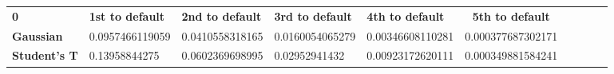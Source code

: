 \begin{center}
 \begin{tabular}{|l|l|l|l|l|c|c|c|c|c|}
\hline
\textbf{0} & \textbf{1st to default} & \textbf{2nd to default} & \textbf{3rd to default} & \textbf{4th to default} & \textbf{5th to default}\\\hhline{|=|=|=|=|=|=|}
\textbf{Gaussian} & 0.0957466119059 & 0.0410558318165 & 0.0160054065279 & 0.00346608110281 & 0.000377687302171\\
\textbf{Student's T} & 0.13958844275 & 0.0602369698995 & 0.02952941432 & 0.00923172620111 & 0.000349881584241\\
\hline
\end{tabular}
\end{center}